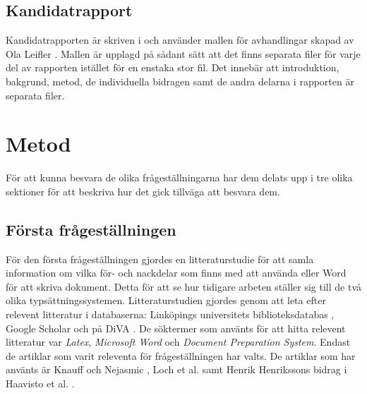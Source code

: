 \subsection{Kandidatrapport}
\label{sec:thesis-info-tuhkala}
Kandidatrapporten är skriven i \latex och använder mallen för avhandlingar skapad av Ola Leifler \cite{thesis_template}. Mallen är upplagd på sådant sätt att det finns separata filer för varje del av rapporten istället för en enstaka stor fil. Det innebär att introduktion, bakgrund, metod, de individuella bidragen samt de andra delarna i rapporten är separata filer.

\section{Metod}
\label{sec:method-tuhkala}
För att kunna besvara de olika frågeställningarna har dem delats upp i tre olika sektioner för att beskriva hur det gick tillväga att besvara dem.

\subsection{Första frågeställningen}
För den första frågeställningen gjordes en litteraturstudie för att samla information om vilka för- och nackdelar som finns med att använda \latex eller Word för att skriva dokument. Detta för att se hur tidigare arbeten ställer sig till de två olika typsättningssystemen. Litteraturstudien gjordes genom att leta efter relevent litteratur i databaserna: Linköpings universitets biblioteksdatabas \cite{liu_bibliotek}, Google Scholar \cite{google_scholar} och på DiVA \cite{diva_portal}. De söktermer som använts för att hitta relevent litteratur var \textit{Latex}, \textit{Microsoft Word} och \textit{Document Preparation System}. Endast de artiklar som varit releventa för frågeställningen har valts. De artiklar som har använts är Knauff och Nejasmic \cite{knauff2014efficiency}, Loch et al. \cite{loch2014master} samt Henrik Henrikssons bidrag i Haavisto et al. \cite{Haavisto954095}.

